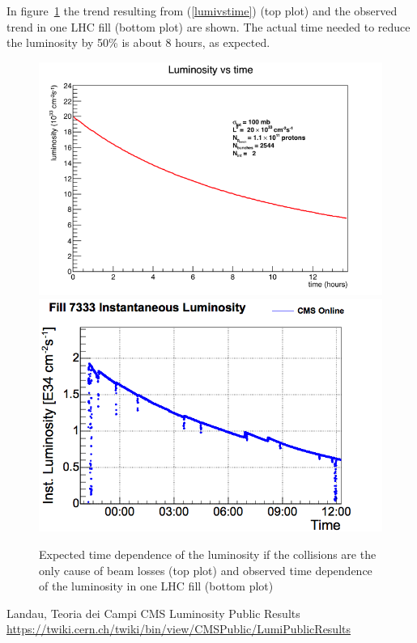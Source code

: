 \documentclass[10pt]{article}
\begin{document}
In figure~\ref{fig:lumivstime} the trend resulting from (\ref{lumivstime}) (top plot) and the observed trend in one LHC fill (bottom plot) are shown. The actual time needed to reduce the luminosity by 50\% is about 8 hours, as expected.
\begin{figure}[htbp]
\begin{center}
\includegraphics[width=\textwidth]{lumivstime.png}
\includegraphics[width=\textwidth]{fill_7333_inst_lumi_cms.png}
\caption{Expected time dependence of the luminosity if the collisions are the only cause of beam losses (top plot) and observed time dependence of the luminosity in one LHC fill (bottom plot)}
\label{fig:lumivstime}
\end{center}
\end{figure}

%
\begin{thebibliography}{1}
 Landau, Teoria dei Campi
 CMS Luminosity Public Results \href{url}{https://twiki.cern.ch/twiki/bin/view/CMSPublic/LumiPublicResults}
\end{thebibliography}
\end{document}
